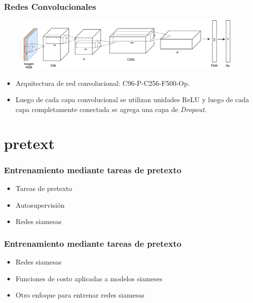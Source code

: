 \documentclass{beamer}
\begin{document}
\begin{frame}
\frametitle{Redes Convolucionales}
\begin{figure}
    \centering
    \includegraphics[width=\textwidth]{images/net_example.pdf}
\end{figure}
\begin{itemize}
    \item Arquitectura de red convolucional: C96-P-C256-F500-Op.
    \item Luego de cada capa convolucional se utilizan unidades ReLU y luego de cada capa completamente conectada se agrega una capa de \textit{Dropout}.
\end{itemize}
\end{frame}





\section{pretext}
\begin{frame}
\frametitle{Entrenamiento mediante tareas de pretexto}
\begin{itemize}
    \item Tareas de pretexto 
    \item Autosupervisión 
    \item Redes siamesas 
\end{itemize}
\end{frame}





\begin{frame}
\frametitle{Entrenamiento mediante tareas de pretexto}
\begin{itemize}
    \item Redes siamesas 
    \item Funciones de costo aplicadas a modelos siameses 
    \item Otro enfoque para entrenar redes siamesas 
\end{itemize}
\end{frame}
\end{document}
